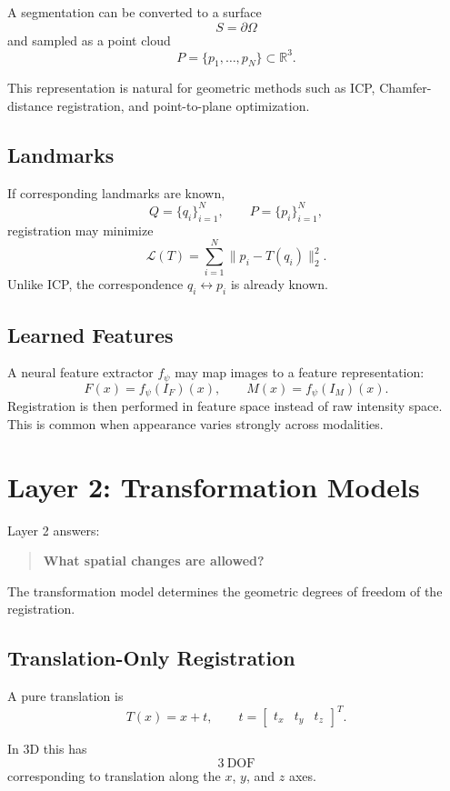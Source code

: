 \documentclass[11pt,a4paper]{article}
\newcommand{\R}{\mathbb{R}}
\newcommand{\Loss}{\mathcal{L}}
\begin{document}
A segmentation can be converted to a surface
\[
S=\partial\Omega
\]
and sampled as a point cloud
\[
P=\{p_1,\dots,p_N\}\subset\R^3.
\]

This representation is natural for geometric methods such as ICP, Chamfer-distance registration, and point-to-plane optimization.

\subsection{Landmarks}

If corresponding landmarks are known,
\[
Q=\{q_i\}_{i=1}^N,
\qquad
P=\{p_i\}_{i=1}^N,
\]
registration may minimize
\[
\Loss(T)=\sum_{i=1}^N\|p_i-T(q_i)\|_2^2.
\]
Unlike ICP, the correspondence $q_i\leftrightarrow p_i$ is already known.

\subsection{Learned Features}

A neural feature extractor $f_\psi$ may map images to a feature representation:
\[
F(x)=f_\psi(I_F)(x),
\qquad
M(x)=f_\psi(I_M)(x).
\]
Registration is then performed in feature space instead of raw intensity space. This is common when appearance varies strongly across modalities.

\section{Layer 2: Transformation Models}

Layer 2 answers:

\begin{quote}
\textbf{What spatial changes are allowed?}
\end{quote}

The transformation model determines the geometric degrees of freedom of the registration.

\subsection{Translation-Only Registration}

A pure translation is
\[
T(x)=x+t,
\qquad
 t=\begin{bmatrix}t_x&t_y&t_z\end{bmatrix}^T.
\]

In 3D this has
\[
\boxed{3\ \text{DOF}}
\]
corresponding to translation along the $x$, $y$, and $z$ axes.
\end{document}
